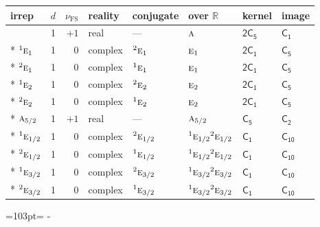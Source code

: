 \documentclass[10pt,a4paper]{article}
\makeatletter
\def\grouprule#1#2{\noalign{\marks\LTgroupmarks{\the\belowrulesep}\nobreak\vskip#1%
  \vskip\aboverulesep}\multispan\LT@cols\unskip{\leaders\hrule\@height#2\hfill\kern\z@}\cr
  \noalign{\penalty\LTrulebreak\vskip\belowrulesep\global\@lastruleclass\z@}}
\newcommand{\needspace}[1]{\par\penalty-100\begingroup\dimen0=#1\relax\dimen2=\pagegoal
  \advance\dimen2-\pagetotal\ifdim\dimen0>\dimen2\relax\ifdim\dimen2>0pt\vfil\break\fi\fi
  \endgroup}
\numberwithin{equation}{section}
\newcommand{\grp}[1]{\mathsf{#1}}
\newcommand{\irr}[1]{\text{\normalfont\scshape #1}}
\newcommand{\conjpair}[1]{{}^{#1}}
\newcommand{\detbox}[1]{{\setlength{\fboxsep}{1pt}\fbox{#1}}}
\newcommand{\fsind}{\nu_{\mathrm{FS}}}
\makeatother
\begin{document}
{\small\renewcommand{\arraystretch}{1.25}\setlength{\tabcolsep}{4pt}\begin{longtable}{@{}lrrlllll@{}}\toprule
irrep & $d$ & $\fsind$ & reality & conjugate & over $\mathbb{R}$ & kernel & image\\\midrule\endhead
\bottomrule\endfoot\endlastfoot
\detbox{$\irr{a}$} & 1 & $+1$ & real & --- & $\irr{a}$ & \href{2C5.pdf}{$\grp{2C_{5}}$} & \href{../../../rotation/data/pdf/C1.pdf}{$\grp{C_{1}}$}\\*
$\conjpair{1}\irr{e}_{1}$ & 1 & $0$ & complex & $\conjpair{2}\irr{e}_{1}$ & $\irr{e}_{1}$ & \href{2C1.pdf}{$\grp{2C_{1}}$} & \href{../../../rotation/data/pdf/C5.pdf}{$\grp{C_{5}}$}\\*
$\conjpair{2}\irr{e}_{1}$ & 1 & $0$ & complex & $\conjpair{1}\irr{e}_{1}$ & $\irr{e}_{1}$ & \href{2C1.pdf}{$\grp{2C_{1}}$} & \href{../../../rotation/data/pdf/C5.pdf}{$\grp{C_{5}}$}\\*
$\conjpair{1}\irr{e}_{2}$ & 1 & $0$ & complex & $\conjpair{2}\irr{e}_{2}$ & $\irr{e}_{2}$ & \href{2C1.pdf}{$\grp{2C_{1}}$} & \href{../../../rotation/data/pdf/C5.pdf}{$\grp{C_{5}}$}\\*
$\conjpair{2}\irr{e}_{2}$ & 1 & $0$ & complex & $\conjpair{1}\irr{e}_{2}$ & $\irr{e}_{2}$ & \href{2C1.pdf}{$\grp{2C_{1}}$} & \href{../../../rotation/data/pdf/C5.pdf}{$\grp{C_{5}}$}\\*
\grouprule{0pt}{\lightrulewidth}
$\irr{a}_{5/2}$ & 1 & $+1$ & real & --- & $\irr{a}_{5/2}$ & \href{C5.pdf}{$\grp{C_{5}}$} & \href{../../../rotation/data/pdf/C2.pdf}{$\grp{C_{2}}$}\\*
$\conjpair{1}\irr{e}_{1/2}$ & 1 & $0$ & complex & $\conjpair{2}\irr{e}_{1/2}$ & $\conjpair{1}\irr{e}_{1/2}\conjpair{2}\irr{e}_{1/2}$ & \href{C1.pdf}{$\grp{C_{1}}$} & \href{../../../rotation/data/pdf/C10.pdf}{$\grp{C_{10}}$}\\*
$\conjpair{2}\irr{e}_{1/2}$ & 1 & $0$ & complex & $\conjpair{1}\irr{e}_{1/2}$ & $\conjpair{1}\irr{e}_{1/2}\conjpair{2}\irr{e}_{1/2}$ & \href{C1.pdf}{$\grp{C_{1}}$} & \href{../../../rotation/data/pdf/C10.pdf}{$\grp{C_{10}}$}\\*
$\conjpair{1}\irr{e}_{3/2}$ & 1 & $0$ & complex & $\conjpair{2}\irr{e}_{3/2}$ & $\conjpair{1}\irr{e}_{3/2}\conjpair{2}\irr{e}_{3/2}$ & \href{C1.pdf}{$\grp{C_{1}}$} & \href{../../../rotation/data/pdf/C10.pdf}{$\grp{C_{10}}$}\\*
$\conjpair{2}\irr{e}_{3/2}$ & 1 & $0$ & complex & $\conjpair{1}\irr{e}_{3/2}$ & $\conjpair{1}\irr{e}_{3/2}\conjpair{2}\irr{e}_{3/2}$ & \href{C1.pdf}{$\grp{C_{1}}$} & \href{../../../rotation/data/pdf/C10.pdf}{$\grp{C_{10}}$}\\
\bottomrule\end{longtable}}
\needspace{103pt}
\end{document}
